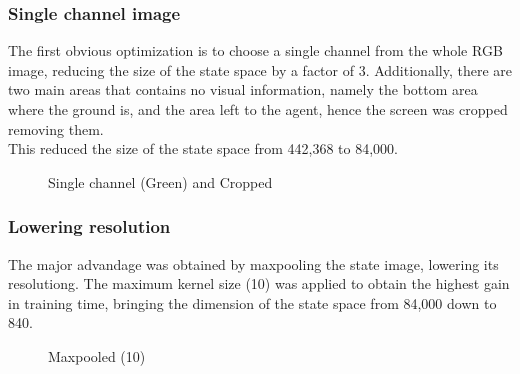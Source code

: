 \documentclass[11pt,a4paper,twocolumn]{IEEEtran}
\begin{document}
		\subsubsection{Single channel image} The first obvious optimization is to choose a single channel from the whole RGB image, reducing the size of the state space by a factor of 3. Additionally, there are two main areas that contains no visual information, namely the bottom area where the ground is, and the area left to the agent, hence the screen was cropped removing them.\\ This reduced the size of the state space from 442,368 to 84,000.\vspace*{-1cm}\\
		\begin{figure}[h]
			\centering
			\vspace*{-.7cm}
			\caption{Single channel (Green) and Cropped}
		\end{figure}
		\newpage
		\subsubsection{Lowering resolution} The major advandage was obtained by maxpooling the state image, lowering its resolutiong. The maximum kernel size (10) was applied to obtain the highest gain in training time, bringing the dimension of the state space from 84,000 down to 840.\vspace*{-1cm}\\
		\begin{figure}[h]
			\centering
			\vspace*{-1cm}
			\caption{Maxpooled (10)}
		\end{figure}
\end{document}
